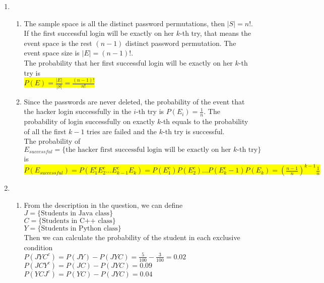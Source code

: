 \documentclass{article}
\begin{document}
\begin{enumerate}
\begin{enumerate}
		
	\end{enumerate}
	\item
	\begin{enumerate}
		\item
		\mysolu
		The sample space is all the distinct password permutations, then ${|S|=n!}$. If the first successful login will be exactly on her ${k}$-th try, that means the event space is the rest ${(n-1)}$ distinct password permutation. The event space size is ${|E|=(n-1)!}$.\\
		\myansw
		The probability that her first successful login will be exactly on her ${k}$-th try is\\
		\colorbox{yellow}{
			${P(E)=\frac{|E|}{|S|}=\frac{(n-1)!}{n!}}$
		}\\
	
		\item
		\mysolu
		Since the passwords are never deleted, the probability of the event that the hacker login successfully in the ${i}$-th try is ${P(E_i)=\frac{1}{n}}$. The probability of login successfully on exactly ${k}$-th equals to the probability of all the first ${k-1}$ tries are failed and the ${k}$-th try is successful.\\
		\myansw
		The probability of ${E_{successful} = \{\text{the hacker first successful login will be exactly on her }k\text{-th try}\}}$ is\\
		\colorbox{yellow}{
			${P(E_{successful})=P(E^c_1E^c_2\ldots E^c_{k-1}E_k)=P(E^c_1)P(E^c_2)\ldots P(E^c_k-1)P(E_k)=(\frac{n-1}{n})^{k-1}\frac{1}{n}}$
		}\\
	\end{enumerate}
	\item 
	\begin{enumerate}
		\item
		\mysolu
		From the description in the question, we can define\\
		${J = \{\text{Students in Java class}\}}$\\
		${C = \{\text{Students in C++ class}\}}$\\
		${Y = \{\text{Students in Python class}\}}$\\
		Then we can calculate the probability of the student in each exclusive condition\\
		${P(JYC^c)=P(JY)-P(JYC)=\frac{5}{100}-
			\frac{3}{100}=0.02}$\\
		${P(JCY^c)=P(JC)-P(JYC)=0.09}$\\
		${P(YCJ^c)=P(YC)-P(JYC)=0.04}$\\

\end{enumerate}
\end{enumerate}
\end{document}
